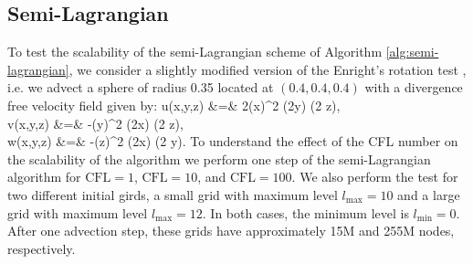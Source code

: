 \subsection{Semi-Lagrangian}
To test the scalability of the semi-Lagrangian scheme of Algorithm \ref{alg:semi-lagrangian}, we consider a slightly modified version of the Enright's rotation test \cite{Enright;Fedkiw;Ferziger;etal:02:A-Hybrid-Particle-Le}, i.e. we advect a sphere of radius 0.35 located at $(0.4, 0.4, 0.4)$ with a divergence free velocity field given by:
\bean
u(x,y,z) &=& 2\sin(\pi x)^2 \sin(2\pi y) \sin(2 \pi z), \\
v(x,y,z) &=& -\sin(\pi y)^2 \sin(2\pi x) \sin(2 \pi z),\\
w(x,y,z) &=& -\sin(\pi z)^2 \sin(2\pi x) \sin(2 \pi y). 
\eean
To understand the effect of the CFL number on the scalability of the algorithm we perform one step of the semi-Lagrangian algorithm for $\text{CFL} = 1$, $\text{CFL} = 10$, and $\text{CFL} = 100$. We also perform the test for two different initial girds, a small grid with maximum level $l_\text{max} = 10$ and a large grid with maximum level $l_\text{max} = 12$. In both cases, the minimum level is $l_\text{min}=0$. After one advection step, these grids have approximately 15M and 255M nodes, respectively. 

